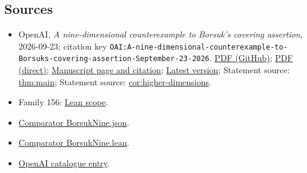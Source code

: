 \documentclass[11pt]{article}
\begin{document}
\subsection{Sources}
\begin{itemize}
\item OpenAI, \emph{A nine-dimensional counterexample to Borsuk's covering assertion}, 2026-09-23; citation key \texttt{OAI:A-nine-dimensional-counterexample-to-Borsuks-covering-assertion-September-23-2026}. \href{https://github.com/openai/math/blob/adc7f1241b42e322a6451854ab7e4b4c146bf78a/preprints/A-nine-dimensional-counterexample-to-Borsuks-covering-assertion-September-23-2026/paper.pdf}{PDF (GitHub)}; \href{https://github.com/openai/math/raw/adc7f1241b42e322a6451854ab7e4b4c146bf78a/preprints/A-nine-dimensional-counterexample-to-Borsuks-covering-assertion-September-23-2026/paper.pdf}{PDF (direct)}; \href{https://github.com/openai/math/blob/adc7f1241b42e322a6451854ab7e4b4c146bf78a/preprints/A-nine-dimensional-counterexample-to-Borsuks-covering-assertion-September-23-2026/README.md}{Manuscript page and citation}; \href{https://github.com/openai/math/blob/main/preprints/A-nine-dimensional-counterexample-to-Borsuks-covering-assertion-September-23-2026/paper.pdf}{Latest version}; Statement source: \href{https://github.com/openai/math/blob/adc7f1241b42e322a6451854ab7e4b4c146bf78a/preprints/A-nine-dimensional-counterexample-to-Borsuks-covering-assertion-September-23-2026/build/sections/introduction.tex\#L18}{thm:main}; Statement source: \href{https://github.com/openai/math/blob/adc7f1241b42e322a6451854ab7e4b4c146bf78a/preprints/A-nine-dimensional-counterexample-to-Borsuks-covering-assertion-September-23-2026/build/sections/conclusion.tex\#L22}{cor:higher-dimensions}.
\item Family 156: \href{https://github.com/openai/math/blob/adc7f1241b42e322a6451854ab7e4b4c146bf78a/lean/docs/156.md}{Lean scope}.
\item \href{https://github.com/openai/math/blob/adc7f1241b42e322a6451854ab7e4b4c146bf78a/lean/ComparatorChallenges/BorsukNine.json}{Comparator BorsukNine.json}.
\item \href{https://github.com/openai/math/blob/adc7f1241b42e322a6451854ab7e4b4c146bf78a/lean/ComparatorChallenges/BorsukNine.lean}{Comparator BorsukNine.lean}.
\item \href{https://github.com/openai/math/blob/adc7f1241b42e322a6451854ab7e4b4c146bf78a/CONTENTS.md}{OpenAI catalogue entry}.
\end{itemize}
\end{document}
